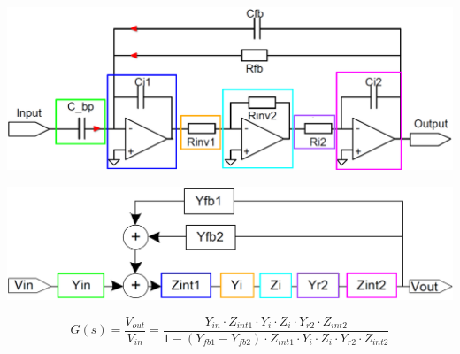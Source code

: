 \begin{minipage}[c]{0.48\columnwidth}
    \includegraphics[width=\columnwidth]{images/signalflussdiagramme_bandpass_schaltung.png}
\end{minipage}
\hfill
\begin{minipage}[c]{0.48\columnwidth}
    \includegraphics[width=\columnwidth]{images/signalflussdiagramme_bandpass_blockschaltbild.png}
\end{minipage}

$$ G(s) = \frac{V_{out}}{V_{in}} = \frac{Y_{in} \cdot Z_{int1} \cdot Y_i \cdot Z_i \cdot Y_{r2} \cdot Z_{int2} }
    {1 - (Y_{fb1} - Y_{fb2}) \cdot Z_{int1} \cdot Y_i \cdot Z_i \cdot Y_{r2} \cdot Z_{int2} } $$